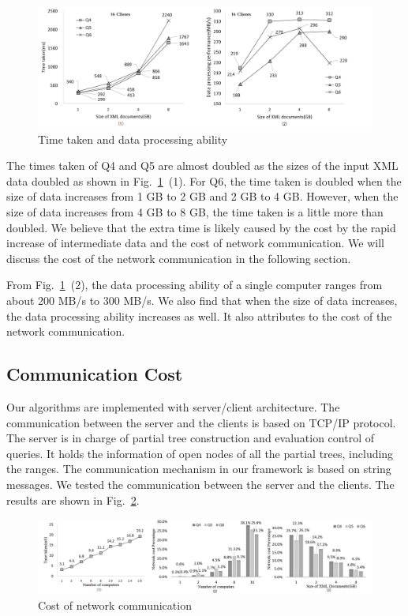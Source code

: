 \begin{figure}[t]
\includegraphics[width=.95\linewidth]{partialtree/figures/ex2.png}
\caption{Time taken and data processing ability}
\label{fig:exp-2}
\end{figure}
 
The times taken of Q4 and Q5 are almost doubled as the sizes of the input XML
data doubled as shown in Fig.~\ref{fig:exp-2}~(1). For Q6, the time taken is doubled
when the size of data increases from 1 GB to 2 GB and 2 GB to 4 GB. However,
when the size of data increases from 4 GB to 8 GB, the time taken is a little
more than doubled. We believe that the extra time is likely caused by 
the cost by the rapid increase of intermediate
data and the cost of network communication. We will discuss the cost of
the network communication in the following section.

From Fig.~\ref{fig:exp-2}~(2), the data processing ability of a single
computer ranges from about 200 MB/s to 300 MB/s. We also find that when
the size of data increases, the data processing ability increases as
well. It also attributes to the cost of the network communication.



\subsection{Communication Cost}
\label{sec:networkcost}

Our algorithms are implemented with server/client architecture. 
The communication between the server and the clients is based
on TCP/IP protocol. The server is in charge of partial tree construction and 
evaluation control of queries. It holds the information of open nodes of all the partial trees,
including the ranges. The communication mechanism in our framework is based on string messages. 
We tested the communication between the server and the clients. The results
are shown in Fig.~\ref{fig:exp-3}.
 
\begin{figure}[t]
\includegraphics[width=.95\linewidth]{partialtree/figures/ex3.png}
\caption{Cost of network communication}
\label{fig:exp-3}
\end{figure}

